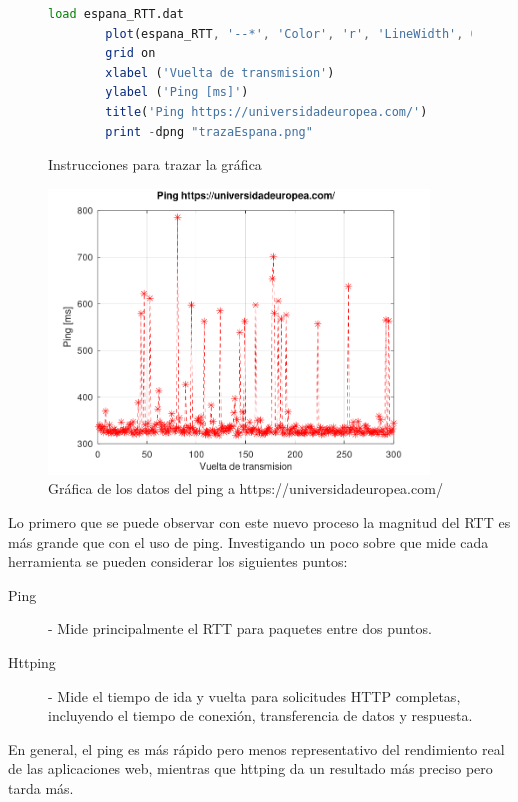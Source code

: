 \begin{figure}[H] 
    \centering 
    \begin{lstlisting}[frame=single, breaklines=true, basicstyle=\footnotesize\ttfamily, breakatwhitespace=false, columns=flexible, tabsize=2, showstringspaces=false, language=Octave] 
        load espana_RTT.dat 
        plot(espana_RTT, '--*', 'Color', 'r', 'LineWidth', 0.5, 'MarkerSize', 8) 
        grid on 
        xlabel ('Vuelta de transmision') 
        ylabel ('Ping [ms]') 
        title('Ping https://universidadeuropea.com/') 
        print -dpng "trazaEspana.png" 
    \end{lstlisting} 
    \caption{Instrucciones para trazar la gr\'afica} 
    \label{fig:espanaOctave} 
\end{figure}

\begin{figure}[H]
	\centering
	\includegraphics[width=0.90\textwidth]{img/trazaEspana.png}
	\caption{Gr\'afica de los datos del ping a https://universidadeuropea.com/}
	\label{fig:espanaGraph}
\end{figure}

\noindent Lo primero que se puede observar con este nuevo proceso la magnitud del RTT es m\'as grande que con el uso de ping. Investigando un poco sobre que mide cada herramienta se pueden considerar los siguientes puntos:

\begin{description}
    \item[Ping] - Mide principalmente el RTT para paquetes entre dos puntos.
    \item[Httping] - Mide el tiempo de ida y vuelta para solicitudes HTTP completas, incluyendo el tiempo de conexi\'on, transferencia de datos y respuesta. 
\end{description}

\noindent En general, el ping es m\'as r\'apido pero menos representativo del rendimiento real de las aplicaciones web, mientras que httping da un resultado m\'as preciso pero tarda m\'as.